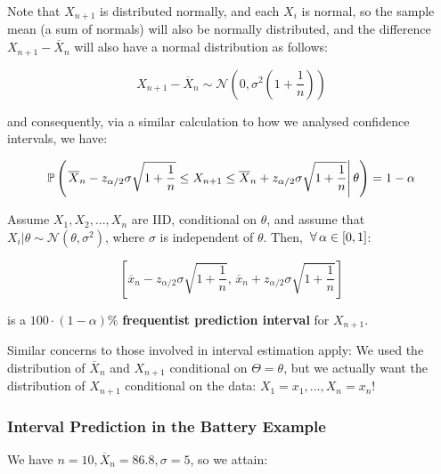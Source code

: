 \documentclass[a4paper]{article}
\begin{document}
            Note that $X_{n + 1}$ is distributed normally, and each $X_i$ is
            normal, so the sample mean (a sum of normals) will also be normally
            distributed, and the difference $X_{n + 1} - \overline X_n$ will
            also have a normal distribution as follows:

            \[
                X_{n + 1} - \overline X_n \sim \mathcal{N}\left(0,
                \sigma^2\left(1 + \frac{1}{n}\right)\right)
            \]

            and consequently, via a similar calculation to how we analysed
            confidence intervals, we have:

            \[
                \mathbb{P}\left(\left.\overline X_n - z_{\alpha/2} \sigma\sqrt{1 +
                \frac{1}{n}} \leq X_{n + 1} \leq \overline X_{n} + z_{\alpha/2}
                \sigma\sqrt{1 + \frac{1}{n}} \right| \theta\right) = 1 - \alpha
            \]

            \begin{definition}
                Assume $X_1, X_2, ..., X_n$ are IID, conditional on $\theta$,
                and assume that $X_i | \theta \sim \mathcal{N} (\theta,
                \sigma^2)$, where $\sigma$ is independent of $\theta$. Then,
                $\,\forall\, \alpha \in [0, 1]$:

                \[
                    \left[\overline x_n - z_{\alpha/2}\sigma\sqrt{1 +
                    \frac{1}{n}}, \,\overline x_n + z_{\alpha/2} \sigma\sqrt{1 +
                    \frac{1}{n}}\right]
                \]

                is a $100 \cdot (1 - \alpha)\%$ \textbf{frequentist prediction
                interval} for $X_{n + 1}$.
            \end{definition}

            \begin{warn}
                Similar concerns to those involved in interval estimation apply:
                We used the distribution of $\overline X_n$ and $X_{n + 1}$
                conditional on $\Theta = \theta$, but we actually want the
                distribution of $X_{n + 1}$ conditional on the data: $X_1 = x_1,
                ..., X_n = x_n$!
            \end{warn}

            \subsubsection{Interval Prediction in the Battery Example}
                We have $n = 10, \overline X_n = 86.8, \sigma = 5$, so we
                attain:
\end{document}

